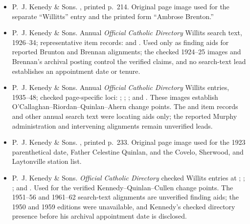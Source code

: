 \begin{itemize}[leftmargin=1.35em,itemsep=0.2em,topsep=0.2em]
\item P.~J. Kenedy \& Sons. , printed p.~214. Original page image used for the separate ``Willitts'' entry and the printed form ``Ambrose Brenton.''
\item P.~J. Kenedy \& Sons. Annual \emph{Official Catholic Directory} Willits search text, 1926--34; representative item records:  and . Used only as finding aids for reported Brunton and Brennan alignments; the checked 1924--25 images and Brennan's archival posting control the verified claims, and no search-text lead establishes an appointment date or tenure.
\item P.~J. Kenedy \& Sons. Annual \emph{Official Catholic Directory} Willits entries, 1935--48; checked page-specific loci: ; ; ; and . These images establish O'Callaghan--Riordan--Quinlan--Ahern change points. The  and  item records and other annual search text were locating aids only; the reported Murphy administration and intervening alignments remain unverified leads.
\item P.~J. Kenedy \& Sons. , printed p.~233. Original page image used for the 1923 parenthetical date, Father Celestine Quinlan, and the Covelo, Sherwood, and Laytonville station list.
\item P.~J. Kenedy \& Sons. \emph{Official Catholic Directory} checked Willits entries at ; ; ; and . Used for the verified Kennedy--Quinlan--Cullen change points. The 1951--56 and 1961--62 search-text alignments are unverified finding aids; the 1950 and 1959 editions were unavailable, and Kennedy's checked directory presence before his archival appointment date is disclosed.

\end{itemize}
